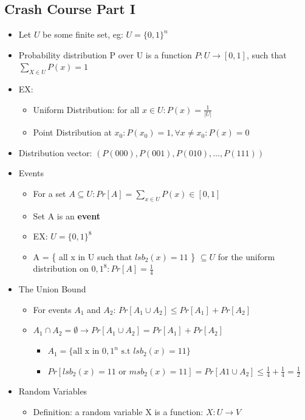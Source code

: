 \documentclass[]{article}
\begin{document}
\subsection{Crash Course Part I}
\begin{itemize}
	\item Let $U$ be some finite set, eg: $U = \{0,1\}^{n}$
	\item Probability distribution P over U is a function $P: U \rightarrow [0,1]$, such that $\sum_{X \in U}^{}P(x) = 1$
	\item EX:
	\begin{itemize}
		\item Uniform Distribution: for all $x \in U: P(x) = \frac{1}{|U|}$
		\item Point Distribution at $x_{0}: P(x_{0}) = 1, \forall x \neq x_{0}: P(x) = 0$
	\end{itemize}
	\item Distribution vector: $( P(000), P(001), P(010), \dots , P(111) )$
	\item Events
	\begin{itemize}
		\item For a set $A \subseteq U: Pr[A] = \sum_{x \in U}^{}P(x) \in [0,1]$
		\item Set A is an \textbf{event}
		\item EX: $U = \{0,1\}^{8}$
		\item A = \{ all x in U such that $lsb_{2}(x) = 11$ \} $\subseteq U$ for the uniform distribution on ${0,1}^{8}: Pr[A] = \frac{1}{4}$
	\end{itemize}
	\item The Union Bound
	\begin{itemize}
		\item For events $A_{1}$ and $A_{2}$: $Pr[A_{1} \cup A_{2}] \leq Pr[A_{1}] + Pr[A_{2}]$
		\item $A_{1} \cap A_{2} = \emptyset \rightarrow Pr[A_{1} \cup A_{2}] = Pr[A_{1}] + Pr[A_{2}]$
		\begin{itemize}
			\item $A_{1} = \{ \text{all x in } {0,1}^{n} \text{ s.t } lsb_{2}(x) = 11 \}$
			\item $Pr[ lsb_{2}(x) = 11 \text{ or } msb_{2}(x) = 11] = Pr[A{1} \cup A_{2}] \leq \frac{1}{4} + \frac{1}{4} = \frac{1}{2}$
		\end{itemize}
	\end{itemize}
	\item Random Variables
	\begin{itemize}
		\item Definition: a random variable X is a function: $X: U \rightarrow V$

\end{itemize}
\end{itemize}
\end{document}
